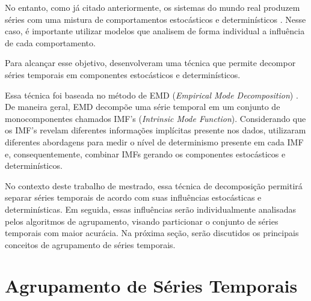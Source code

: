 
No entanto, como já citado anteriormente, os sistemas do mundo real produzem séries com uma mistura de comportamentos estocásticos e determinísticos \cite{han2009}. Nesse caso, é importante utilizar modelos que analisem de forma individual a influência de cada comportamento. 

Para alcançar esse objetivo,  desenvolveram uma técnica que permite decompor séries temporais em componentes estocásticos e determinísticos.

Essa técnica foi baseada no método de \ac{EMD} (\emph{Empirical Mode Decomposition}) \cite{Huang1998}. De maneira geral, \ac{EMD} decompõe uma série temporal em um conjunto de monocomponentes chamados IMF's (\emph{Intrinsic Mode Function}). Considerando que os IMF's revelam diferentes informações implícitas presente nos dados,  utilizaram diferentes abordagens para medir o nível de determinismo presente em cada IMF e, consequentemente, combinar IMFs gerando os componentes estocásticos e determinísticos. 

No contexto deste trabalho de mestrado, essa técnica de decomposição permitirá separar séries temporais de acordo com suas influências estocásticas e determinísticas. Em seguida, essas influências serão individualmente analisadas pelos algoritmos de agrupamento, visando particionar o conjunto de séries temporais com maior acurácia. Na próxima seção, serão discutidos os principais conceitos de agrupamento de séries temporais.


\section{Agrupamento de Séries Temporais}

 
